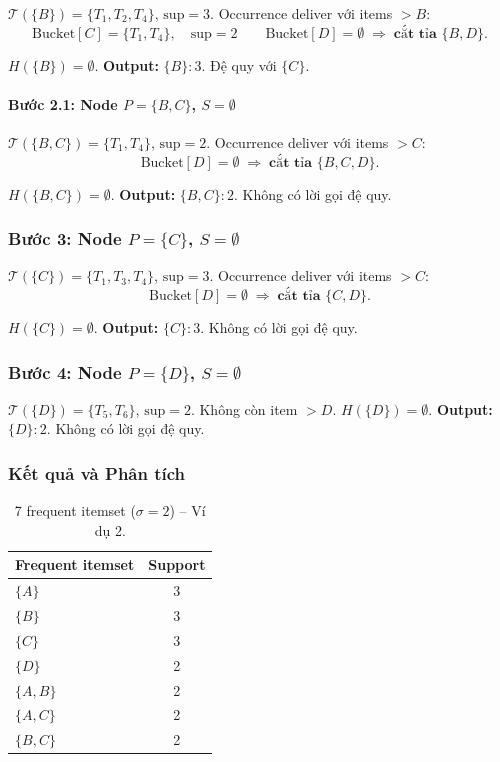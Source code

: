 \documentclass[12pt,a4paper]{article}
\theoremstyle{definition}
\begin{document}
$\mathcal{T}(\{B\}) = \{T_1,T_2,T_4\}$, $\mathrm{sup}=3$.
Occurrence deliver với items $> B$:
\[
    \text{Bucket}[C] = \{T_1,T_4\},\quad \mathrm{sup}=2
    \qquad
    \text{Bucket}[D] = \emptyset
    \;\Rightarrow\; \textbf{cắt tỉa } \{B,D\}.
\]

$H(\{B\}) = \emptyset$. \textbf{Output:} $\{B\}:3$.
Đệ quy với $\{C\}$.

\paragraph{Bước 2.1: Node $P=\{B,C\}$, $S=\emptyset$}

$\mathcal{T}(\{B,C\}) = \{T_1,T_4\}$, $\mathrm{sup}=2$.
Occurrence deliver với items $> C$:
\[
    \text{Bucket}[D] = \emptyset
    \;\Rightarrow\; \textbf{cắt tỉa } \{B,C,D\}.
\]

$H(\{B,C\}) = \emptyset$. \textbf{Output:} $\{B,C\}:2$.
Không có lời gọi đệ quy.

\subsubsection{Bước 3: Node $P=\{C\}$, $S=\emptyset$}

$\mathcal{T}(\{C\}) = \{T_1,T_3,T_4\}$, $\mathrm{sup}=3$.
Occurrence deliver với items $> C$:
\[
    \text{Bucket}[D] = \emptyset
    \;\Rightarrow\; \textbf{cắt tỉa } \{C,D\}.
\]

$H(\{C\}) = \emptyset$. \textbf{Output:} $\{C\}:3$.
Không có lời gọi đệ quy.

\subsubsection{Bước 4: Node $P=\{D\}$, $S=\emptyset$}

$\mathcal{T}(\{D\}) = \{T_5,T_6\}$, $\mathrm{sup}=2$.
Không còn item $> D$.
$H(\{D\}) = \emptyset$.
\textbf{Output:} $\{D\}:2$. Không có lời gọi đệ quy.

\subsubsection{Kết quả và Phân tích}

\begin{table}[H]
\centering
\begin{tabular}{l c}
    \toprule
    \textbf{Frequent itemset} & \textbf{Support} \\
    \midrule
    $\{A\}$ & 3 \\
    $\{B\}$ & 3 \\
    $\{C\}$ & 3 \\
    $\{D\}$ & 2 \\
    $\{A,B\}$ & 2 \\
    $\{A,C\}$ & 2 \\
    $\{B,C\}$ & 2 \\
    \bottomrule
\end{tabular}
\caption{7 frequent itemset ($\sigma=2$) -- Ví dụ 2.}
\label{tab:ex2_result}
\end{table}
\end{document}
